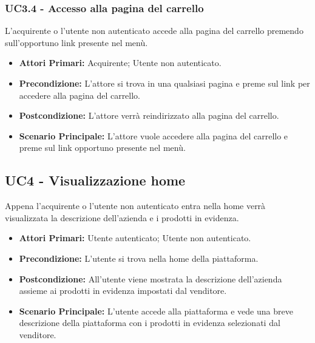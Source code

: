 \subsubsection{UC3.4 - Accesso alla pagina del carrello}\label{UC3.4}
L'acquirente o l'utente non autenticato accede alla pagina del carrello premendo sull'opportuno link presente nel menù.
\begin{itemize}
    \item \textbf{Attori Primari:} Acquirente; Utente non autenticato.
    \item \textbf{Precondizione:} L'attore si trova in una qualsiasi pagina e preme sul link per accedere alla pagina del carrello.
    \item \textbf{Postcondizione:} L'attore verrà reindirizzato alla pagina del carrello.
    \item \textbf{Scenario Principale:} L'attore vuole accedere alla pagina del carrello e preme sul link opportuno presente nel menù.
\end{itemize}

\subsection{UC4 - Visualizzazione home} \label{UC4}
Appena l'acquirente o l'utente non autenticato entra nella home verrà visualizzata la descrizione dell'azienda e i prodotti in evidenza.
\begin{itemize}
    \item \textbf{Attori Primari:} Utente autenticato; Utente non autenticato.
    \item \textbf{Precondizione:} L'utente si trova nella home della piattaforma.
    \item \textbf{Postcondizione:} All'utente viene mostrata la descrizione dell'azienda assieme ai prodotti in evidenza impostati dal venditore.
    \item \textbf{Scenario Principale:} L'utente accede alla piattaforma e vede una breve descrizione della piattaforma con i prodotti in evidenza selezionati dal venditore.
\end{itemize}
